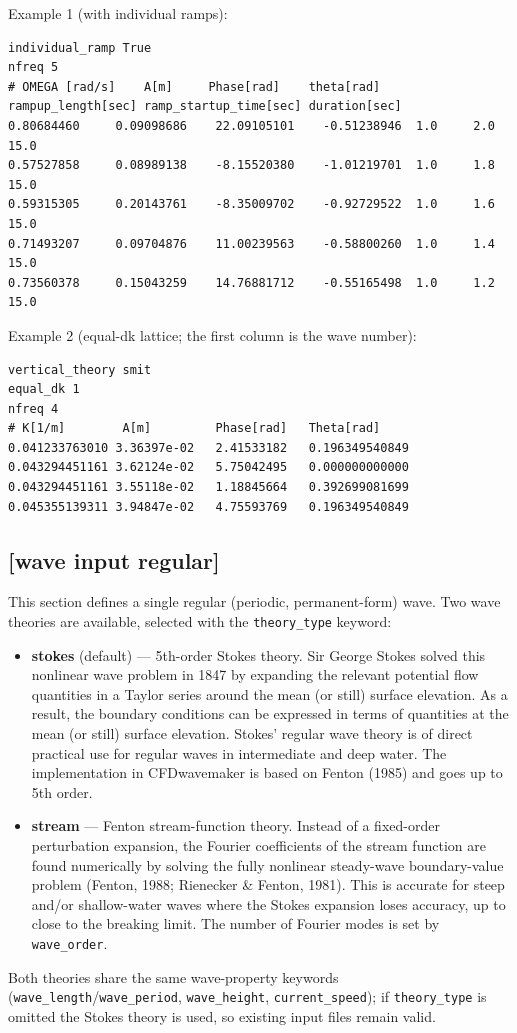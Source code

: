 Example 1 (with individual ramps):
\begin{lstlisting}[]
individual_ramp True
nfreq 5
# OMEGA [rad/s]    A[m]     Phase[rad]    theta[rad]  rampup_length[sec] ramp_startup_time[sec] duration[sec]
0.80684460     0.09098686    22.09105101    -0.51238946  1.0     2.0     15.0
0.57527858     0.08989138    -8.15520380    -1.01219701  1.0     1.8     15.0
0.59315305     0.20143761    -8.35009702    -0.92729522  1.0     1.6     15.0
0.71493207     0.09704876    11.00239563    -0.58800260  1.0     1.4     15.0
0.73560378     0.15043259    14.76881712    -0.55165498  1.0     1.2     15.0
\end{lstlisting}

Example 2 (equal-dk lattice; the first column is the wave number):
\begin{lstlisting}[]
vertical_theory smit
equal_dk 1
nfreq 4
# K[1/m]        A[m]         Phase[rad]   Theta[rad]
0.041233763010 3.36397e-02   2.41533182   0.196349540849
0.043294451161 3.62124e-02   5.75042495   0.000000000000
0.043294451161 3.55118e-02   1.18845664   0.392699081699
0.045355139311 3.94847e-02   4.75593769   0.196349540849
\end{lstlisting}


\subsection{[wave input regular]}
This section defines a single regular (periodic, permanent-form) wave. Two wave theories are available, selected with the \texttt{theory\_type} keyword:
\begin{itemize}
    \item \textbf{stokes} (default) --- 5th-order Stokes theory. Sir George Stokes solved this nonlinear wave problem in 1847 by expanding the relevant potential flow quantities in a Taylor series around the mean (or still) surface elevation. As a result, the boundary conditions can be expressed in terms of quantities at the mean (or still) surface elevation. Stokes' regular wave theory is of direct practical use for regular waves in intermediate and deep water. The implementation in CFDwavemaker is based on Fenton (1985) and goes up to 5th order.
    \item \textbf{stream} --- Fenton stream-function theory. Instead of a fixed-order perturbation expansion, the Fourier coefficients of the stream function are found numerically by solving the fully nonlinear steady-wave boundary-value problem (Fenton, 1988; Rienecker \& Fenton, 1981). This is accurate for steep and/or shallow-water waves where the Stokes expansion loses accuracy, up to close to the breaking limit. The number of Fourier modes is set by \texttt{wave\_order}.
\end{itemize}
Both theories share the same wave-property keywords (\texttt{wave\_length}/\texttt{wave\_period}, \texttt{wave\_height}, \texttt{current\_speed}); if \texttt{theory\_type} is omitted the Stokes theory is used, so existing input files remain valid.

